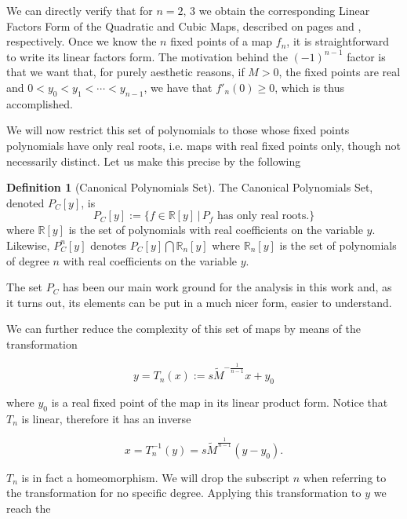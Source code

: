\documentclass[10pt,twoside,titlepage]{book}
\numberwithin{equation}{chapter}
\numberwithin{figure}{chapter}
\numberwithin{table}{chapter}
\theoremstyle{plain}%
\theoremstyle{definition}
\newtheorem{defn}{Definition}[chapter]
\theoremstyle{remark}
\begin{document}
We can directly verify that for $n=2,\,3$ we obtain the corresponding Linear Factors Form of the Quadratic and Cubic Maps, described on pages \pageref{def:LFFQM} and \pageref{def:LFFCM}, respectively. Once we know the $n$ fixed points of a map $f_n$, it is straightforward to write its linear factors form. The motivation behind the $(-1)^{n-1}$ factor is that we want that, for purely aesthetic reasons, if $M>0$, the fixed points are real and $0<y_0<y_1<\cdots<y_{n-1}$, we have that $f'_n(0)\geq0$, which is thus accomplished.

We will now restrict this set of polynomials to those whose fixed points polynomials have only real roots, i.e. maps with real fixed points only, though not necessarily distinct. Let us make this precise by the following

\begin{defn}[Canonical Polynomials Set]
	The Canonical Polynomials Set, denoted $P_C[y]$, is
	\begin{equation}
		P_C[y]:=\{f\in\mathbb{R}[y]\,\vert\,\text{$P_f$ has only real roots.}\}
	\end{equation}
	where $\mathbb{R}[y]$ is the set of polynomials with real coefficients on the variable $y$. Likewise, $P_C^n[y]$ denotes $P_C[y]\bigcap\mathbb{R}_n[y]$ where $\mathbb{R}_n[y]$ is the set of polynomials of degree $n$ with real coefficients on the variable $y$.
\end{defn}

The set $P_C$ has been our main work ground for the analysis in this work and, as it turns out, its elements can be put in a much nicer form, easier to understand.

We can further reduce the complexity of this set of maps by means of the transformation

\begin{equation}
	y=T_n(x):=s\tilde{M}^{-\frac{1}{n-1}}x+y_0
\end{equation}

where $y_0$ is a real fixed point of the map in its linear product form. Notice that $T_n$ is linear, therefore it has an inverse

\begin{equation}
	x=T_n^{-1}(y)=s\tilde{M}^{\frac{1}{n-1}}(y-y_0).
\end{equation}

$T_n$ is in fact a homeomorphism. We will drop the subscript $n$ when referring to the transformation for no specific degree. Applying this transformation to $y$ we reach the
\end{document}
